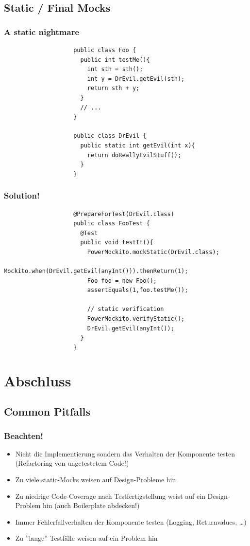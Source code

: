 \documentclass{beamer}
\begin{document}
		\subsection{Static / Final Mocks}

			\begin{frame}[fragile]
				\frametitle{A static nightmare}

				\begin{lstlisting}
					public class Foo {
					  public int testMe(){
					    int sth = sth();
					    int y = DrEvil.getEvil(sth);	
					    return sth + y;
					  }
					  // ...
					}

					public class DrEvil {
					  public static int getEvil(int x){
					    return doReallyEvilStuff();
					  }
					}
				\end{lstlisting}
			\end{frame}

			\begin{frame}[fragile]
				\frametitle{Solution!}

				\begin{lstlisting}
					@PrepareForTest(DrEvil.class)
					public class FooTest {
					  @Test
					  public void testIt(){
					    PowerMockito.mockStatic(DrEvil.class);
					    Mockito.when(DrEvil.getEvil(anyInt())).thenReturn(1);
					    Foo foo = new Foo();
					    assertEquals(1,foo.testMe());

					    // static verification
					    PowerMockito.verifyStatic();
					    DrEvil.getEvil(anyInt());
					  }
					}
				\end{lstlisting}
			\end{frame}



	\section{Abschluss}

		\subsection{Common Pitfalls}

			\begin{frame}
				\frametitle{Beachten!}

				\begin{itemize}
					\item{Nicht die Implementierung sondern das Verhalten der Komponente testen (Refactoring von ungetestetem Code!)}
					\pause
					\item{Zu viele static-Mocks weisen auf Design-Probleme hin}
					\pause
					\item{Zu niedrige Code-Coverage nach Testfertigstellung weist auf ein Design-Problem hin (auch Boilerplate abdecken!)}
					\pause
					\item{Immer Fehlerfallverhalten der Komponente testen (Logging, Returnvalues, \ldots)}
					\pause
					\item{Zu ''lange'' Testfälle weisen auf ein Problem hin}
				\end{itemize}
			\end{frame}
\end{document}
